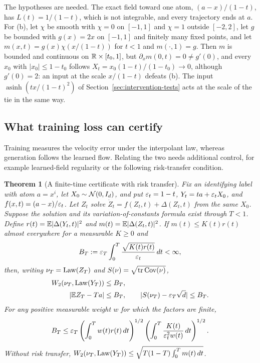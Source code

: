 \documentclass{article} %
\theoremstyle{plain}
\newtheorem{theorem}{Theorem}[section]
\theoremstyle{definition}
\theoremstyle{remark}
\begin{document}
The hypotheses are needed. The exact field toward one atom, $(a-x)/(1-t)$, has
$L(t)=1/(1-t)$, which is not integrable, and every trajectory ends at $a$. For (b), let
$\chi$ be smooth with $\chi=0$ on $[-1,1]$ and $\chi=1$ outside $[-2,2]$, let $g$ be bounded with
$g(x)=2x$ on $[-1,1]$ and finitely many fixed points, and let $m(x,t)=g(x)\chi(x/(1-t))$ for
$t<1$ and $m(\cdot,1)=g$. Then $m$ is bounded and continuous on $\mathbb{R}\times[t_0,1]$, but
$\partial_xm(0,t)=0\ne g'(0)$, and every $x_0$ with $|x_0|\le1-t_0$ follows
$X_t=x_0(1-t)/(1-t_0)\to0$, although $g'(0)=2$: an input at the scale $x/(1-t)$ defeats
(b). The input $\operatorname{asinh}(tx/(1-t)^2)$ of Section~\ref{sec:intervention-tests} acts at
the scale of the tie in the same way.

\subsection{What training loss can certify}
\label{app:teacher-risk}

Training measures the velocity error under the interpolant law, whereas generation follows the
learned flow. Relating the two needs additional control, for example learned-field regularity
\citep{benton2024error} or the following risk-transfer condition.

\begin{theorem}[A finite-time certificate with risk transfer]
\label{thm:risktransfer}
Fix an identifying label with atom $a=x^i$, let $X_0\sim\mathcal{N}(0,I_d)$, and put
$\varepsilon_t=1-t$, $Y_t=ta+\varepsilon_tX_0$, and $f(x,t)=(a-x)/\varepsilon_t$.
Let $Z_t$ solve $\dot Z_t=f(Z_t,t)+\Delta(Z_t,t)$ from the same $X_0$.
Suppose the solution and its variation-of-constants formula exist through $T<1$.
Define $r(t)=\mathbb{E}|\Delta(Y_t,t)|^2$ and $m(t)=\mathbb{E}|\Delta(Z_t,t)|^2$.
If $m(t)\le K(t)r(t)$ almost everywhere for a measurable $K\ge0$ and
\[
B_T:=\varepsilon_T\int_0^T\frac{\sqrt{K(t)r(t)}}{\varepsilon_t}\,dt<\infty,
\]
then, writing $\nu_T=\mathrm{Law}(Z_T)$ and $S(\nu)=\sqrt{\operatorname{tr}\operatorname{Cov}(\nu)}$,
\begin{align}
W_2(\nu_T,\mathrm{Law}(Y_T))&\le B_T,\label{eq:risktransfer}\\
|\mathbb{E} Z_T-Ta|&\le B_T,\qquad
|S(\nu_T)-\varepsilon_T\sqrt d|\le B_T.\label{eq:riskmoments}
\end{align}
For any positive measurable weight $w$ for which the factors are finite,
\[
B_T\le\varepsilon_T\left(\int_0^T w(t)r(t)\,dt\right)^{1/2}
\left(\int_0^T\frac{K(t)}{\varepsilon_t^2w(t)}\,dt\right)^{1/2}.
\]
Without risk transfer, $W_2(\nu_T,\mathrm{Law}(Y_T))\le\sqrt{T(1-T)\int_0^T m(t)\,dt}$.
\end{theorem}
\end{document}
